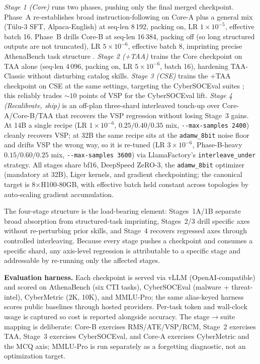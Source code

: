 \documentclass[conference]{IEEEtran}
\providecommand{\hfid}[1]{{\small\nolinkurl{#1}}}
\begin{document}
\emph{Stage 1 (Core)} runs two phases, pushing only the final merged checkpoint. Phase~A re-establishes broad instruction-following on Core-A plus a general mix (Tülu-3 SFT, Alpaca-English) at seq-len 8\,192, packing on, LR $1\times10^{-5}$, effective batch 16. Phase~B drills Core-B at seq-len 16\,384, packing off (so long structured outputs are not truncated), LR $5\times10^{-6}$, effective batch 8, imprinting precise AthenaBench task structure \cite{alam2025athenabench,chung2022flant5,gururangan2020dontstop}. \emph{Stage 2 (+TAA)} trains the Core checkpoint on TAA alone (seq-len 4\,096, packing on, LR $5\times10^{-6}$, batch 16), hardening TAA-Classic without disturbing catalog skills. \emph{Stage 3 (CSE)} trains the +TAA checkpoint on CSE at the same settings, targeting the CyberSOCEval suites \cite{cybersoceval2025}; this reliably trades ${\sim}10$ points of VSP for the CyberSOCEval lift. \emph{Stage 4 (Recalibrate, ship)} is an off-plan three-shard interleaved touch-up over Core-A/Core-B/TAA that recovers the VSP regression without losing Stage~3 gains. At 14B a single recipe (LR $1\times10^{-6}$, $0.25/0.40/0.35$ mix, \hfid{--max-samples 2400}) cleanly recovers VSP; at 32B the same recipe sits at the \hfid{adamw_8bit} noise floor and drifts VSP the wrong way, so it is re-tuned (LR $3\times10^{-6}$, Phase-B-heavy $0.15/0.60/0.25$ mix, \hfid{--max-samples 3600}) via LlamaFactory's \hfid{interleave_under} strategy. All stages share bf16, DeepSpeed ZeRO-3, the \hfid{adamw_8bit} optimizer (mandatory at 32B), Liger kernels, and gradient checkpointing; the canonical target is 8$\times$H100-80GB, with effective batch held constant across topologies by auto-scaling gradient accumulation.

The four-stage structure is the load-bearing element: Stages~1A/1B separate broad absorption from structured-task imprinting, Stages~2/3 drill specific axes without re-perturbing prior skills, and Stage~4 recovers regressed axes through controlled interleaving. Because every stage pushes a checkpoint and consumes a specific shard, any axis-level regression is attributable to a specific stage and addressable by re-running only the affected stages.

\textbf{Evaluation harness.} Each checkpoint is served via vLLM (OpenAI-compatible) and scored on AthenaBench (six CTI tasks), CyberSOCEval (malware + threat-intel), CyberMetric (2K, 10K), and MMLU-Pro; the same alias-keyed harness scores public baselines through hosted providers. Per-task token and wall-clock usage is captured so cost is reported alongside accuracy. The stage$\to$suite mapping is deliberate: Core-B exercises RMS/ATE/VSP/RCM, Stage~2 exercises TAA, Stage~3 exercises CyberSOCEval, and Core-A exercises CyberMetric and the MCQ axis; MMLU-Pro is run separately as a forgetting diagnostic, not an optimization target.
\end{document}
